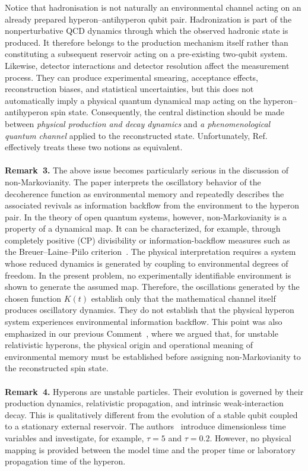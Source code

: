 \documentclass[epjc,twocolumn,nofootinbib,preprintnumbers,amsmath,amssymb]{revtex4-2}
\begin{document}
Notice that hadronisation is not naturally an environmental channel acting on an already prepared hyperon--antihyperon qubit pair. Hadronization is part of the nonperturbative QCD dynamics through which the observed hadronic state is produced. It therefore belongs to the production mechanism itself rather than constituting a subsequent reservoir acting on a pre-existing two-qubit system.
Likewise, detector interactions and detector resolution affect the measurement process. They can produce experimental smearing, acceptance effects, reconstruction biases, and statistical uncertainties, but this does not automatically imply a physical quantum dynamical map acting on the hyperon--antihyperon spin state.
Consequently, the central distinction should be made between \textit{physical production and decay dynamics} and \textit{a phenomenological quantum channel} applied to the reconstructed state. Unfortunately, Ref.~\cite{Bachain} effectively treats these two notions as equivalent.
\\
\\
\textbf{Remark~3.}
The above issue becomes particularly serious in the discussion of non-Markovianity.
The paper interprets the oscillatory behavior of the decoherence function as environmental memory and repeatedly describes the associated revivals as information backflow from the environment to the hyperon pair. In the theory of open quantum systems, however, non-Markovianity is a property of a dynamical map. It can be characterized, for example, through completely positive (CP) divisibility or information-backflow measures such as the Breuer--Laine--Piilo criterion~\cite{Breuer,BreuerLainePiilo,Rivas}. The physical interpretation requires a system whose reduced dynamics is generated by coupling to environmental degrees of freedom.
In the present problem, no experimentally identifiable environment is shown to generate the assumed map. Therefore, the oscillations generated by the chosen function $K(t)$ establish only that the mathematical channel itself produces oscillatory dynamics. They do not establish that the physical hyperon system experiences environmental information backflow.
This point was also emphasized in our previous Comment~\cite{HaddadiPRD}, where we argued that, for unstable relativistic hyperons, the physical origin and operational meaning of environmental memory must be established before assigning non-Markovianity to the reconstructed spin state.
\\
\\
\textbf{Remark~4.}
Hyperons are unstable particles. Their evolution is governed by their production dynamics, relativistic propagation, and intrinsic weak-interaction decay. This is qualitatively different from the evolution of a stable qubit coupled to a stationary external reservoir.
The authors~\cite{Bachain} introduce dimensionless time variables and investigate, for example, $\tau=5$ and $\tau=0.2$. However, no physical mapping is provided between the model time and the proper time or laboratory propagation time of the hyperon.
\end{document}
